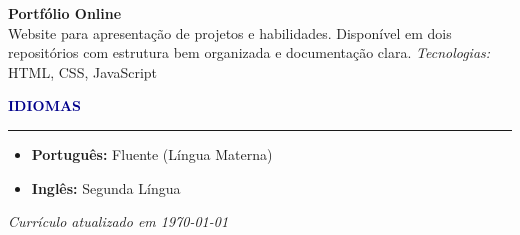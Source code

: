 \documentclass[11pt]{article}
\newcommand{\sectiontitle}[1]{
    \vspace{0.3cm}
    {\large \textbf{\textcolor{darkblue}{#1}}}
    \vspace{0.1cm}
    \hrule
    \vspace{0.2cm}
}
\newcommand{\projectentry}[2]{
    \textbf{#1} \\
    #2
    \vspace{0.15cm}
}
\begin{document}
\projectentry
{Portfólio Online}
{Website para apresentação de projetos e habilidades. Disponível em dois repositórios com estrutura bem organizada e documentação clara.
\newline \textit{Tecnologias:} HTML, CSS, JavaScript}

\sectiontitle{IDIOMAS}

\begin{itemize}[leftmargin=1.5cm, itemsep=0.08cm]
    \item \textbf{Português:} Fluente (Língua Materna)
    \item \textbf{Inglês:} Segunda Língua
\end{itemize}

\vspace{0.3cm}

\begin{center}
    \small \textit{Currículo atualizado em \today}
\end{center}
\end{document}
